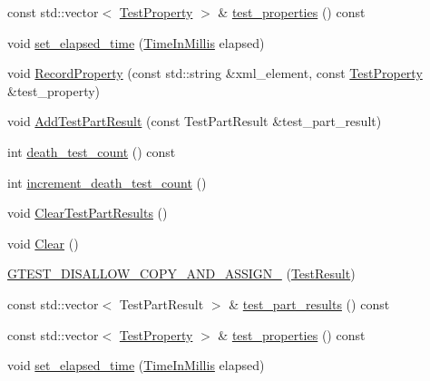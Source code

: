 \begin{DoxyCompactItemize}
\item 
const std\+::vector$<$ \mbox{\hyperlink{classtesting_1_1_test_property}{Test\+Property}} $>$ \& \mbox{\hyperlink{classtesting_1_1_test_result_a8c94e8e89c616abe5d33024a6b54f218}{test\+\_\+properties}} () const
\item 
void \mbox{\hyperlink{classtesting_1_1_test_result_aa345325e5dea41609d17d7c614bf2b18}{set\+\_\+elapsed\+\_\+time}} (\mbox{\hyperlink{namespacetesting_a992de1d091ce660f451d1e8b3ce30fd6}{Time\+In\+Millis}} elapsed)
\item 
void \mbox{\hyperlink{classtesting_1_1_test_result_ac253b0fd7ea70f457e9517e415eac32d}{Record\+Property}} (const std\+::string \&xml\+\_\+element, const \mbox{\hyperlink{classtesting_1_1_test_property}{Test\+Property}} \&test\+\_\+property)
\item 
void \mbox{\hyperlink{classtesting_1_1_test_result_ac28e9821ad3e9314c4fe41b119c5b44d}{Add\+Test\+Part\+Result}} (const Test\+Part\+Result \&test\+\_\+part\+\_\+result)
\item 
int \mbox{\hyperlink{classtesting_1_1_test_result_a827cb78135ac375d81d89ffedc3eca52}{death\+\_\+test\+\_\+count}} () const
\item 
int \mbox{\hyperlink{classtesting_1_1_test_result_a07faaa1d16a991f34222d02e10c75dc2}{increment\+\_\+death\+\_\+test\+\_\+count}} ()
\item 
void \mbox{\hyperlink{classtesting_1_1_test_result_aa11ed718e0a76a39e6380e5ddce7cae2}{Clear\+Test\+Part\+Results}} ()
\item 
void \mbox{\hyperlink{classtesting_1_1_test_result_a5371bc2e69435b4cb1fdad9ca81759a6}{Clear}} ()
\item 
\mbox{\hyperlink{classtesting_1_1_test_result_ad04e1d5d9eb623ba1d9fc82cdff43af4}{G\+T\+E\+S\+T\+\_\+\+D\+I\+S\+A\+L\+L\+O\+W\+\_\+\+C\+O\+P\+Y\+\_\+\+A\+N\+D\+\_\+\+A\+S\+S\+I\+G\+N\+\_\+}} (\mbox{\hyperlink{classtesting_1_1_test_result}{Test\+Result}})
\item 
const std\+::vector$<$ Test\+Part\+Result $>$ \& \mbox{\hyperlink{classtesting_1_1_test_result_a2964c3a12ef6ef9bcb47599374514432}{test\+\_\+part\+\_\+results}} () const
\item 
const std\+::vector$<$ \mbox{\hyperlink{classtesting_1_1_test_property}{Test\+Property}} $>$ \& \mbox{\hyperlink{classtesting_1_1_test_result_a8c94e8e89c616abe5d33024a6b54f218}{test\+\_\+properties}} () const
\item 
void \mbox{\hyperlink{classtesting_1_1_test_result_aa345325e5dea41609d17d7c614bf2b18}{set\+\_\+elapsed\+\_\+time}} (\mbox{\hyperlink{namespacetesting_a992de1d091ce660f451d1e8b3ce30fd6}{Time\+In\+Millis}} elapsed)

\end{DoxyCompactItemize}

